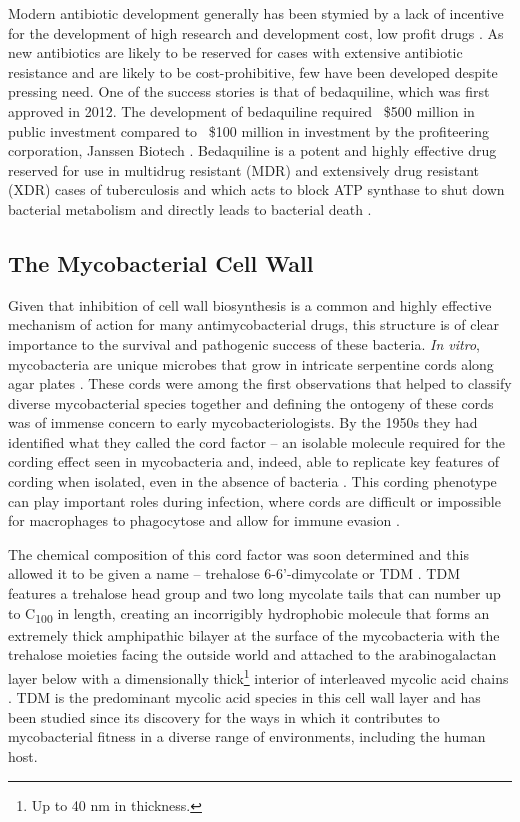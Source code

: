 Modern antibiotic development generally has been stymied by a lack of incentive for the development of high research and development cost, low profit drugs \citep{Joshi2011}. As new antibiotics are likely to be reserved for cases with extensive antibiotic resistance and are likely to be cost\hyp{}prohibitive, few have been developed despite pressing need. One of the success stories is that of bedaquiline, which was first approved in 2012. The development of bedaquiline required ~\$500 million in public investment compared to ~\$100 million in investment by the profiteering corporation, Janssen Biotech \citep{Gotham2020, Leibert2014, Osborne2013}. Bedaquiline is a potent and highly effective drug reserved for use in multidrug resistant (MDR) and extensively drug resistant (XDR) cases of tuberculosis and which acts to block ATP synthase to shut down bacterial metabolism and directly leads to bacterial death \citep{Nguyen2018, Sarathy2019}. 

\subsection{The Mycobacterial Cell Wall}\label{cellwall}

Given that inhibition of cell wall biosynthesis is a common and highly effective mechanism of action for many antimycobacterial drugs, this structure is of clear importance to the survival and pathogenic success of these bacteria. \textit{In vitro}, mycobacteria are unique microbes that grow in intricate serpentine cords along agar plates \citep{Koch1882, Glickman2000}. These cords were among the first observations that helped to classify diverse mycobacterial species together and defining the ontogeny of these cords was of immense concern to early mycobacteriologists. By the 1950s they had identified what they called the cord factor -- an isolable molecule required for the cording effect seen in mycobacteria and, indeed, able to replicate key features of cording when isolated, even in the absence of bacteria \citep{Bloch1955, Bloch1953, Sorkin1952, Hunter2006a, Behling1993}. This cording phenotype can play important roles during infection, where cords are difficult or impossible for macrophages to phagocytose and allow for immune evasion \citep{Bernut2014, Ufimtseva2018}. 

The chemical composition of this cord factor was soon determined and this allowed it to be given a name -- trehalose 6\hyp{}6'\hyp{}dimycolate or TDM \citep{Noll1956a}. TDM features a trehalose head group and two long mycolate tails that can number up to C\textsubscript{100} in length, creating an incorrigibly hydrophobic molecule that forms an extremely thick amphipathic bilayer at the surface of the mycobacteria with the trehalose moieties facing the outside world and attached to the arabinogalactan layer below with a dimensionally thick\footnote{Up to 40 nm in thickness.} interior of interleaved mycolic acid chains \citep{Glickman2008, Welsh2013, BansalMutalik2014, Adhyapak2020, Alderwick2015, Batt2020}. TDM is the predominant mycolic acid species in this cell wall layer and has been studied since its discovery for the ways in which it contributes to mycobacterial fitness in a diverse range of environments, including the human host.


